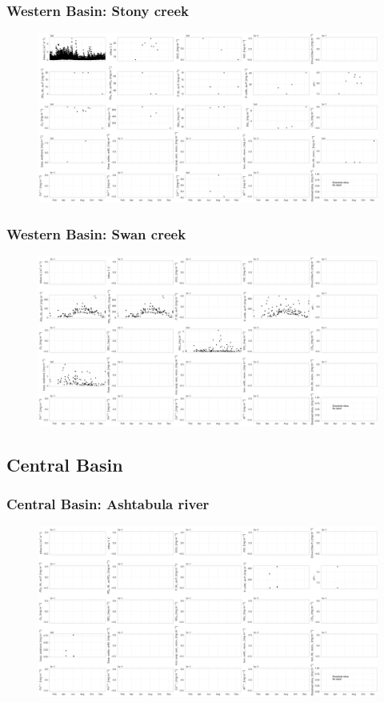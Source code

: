 \documentclass{beamer}
\begin{document}
\begin{frame}
\frametitle{Western Basin: Stony creek}
\begin{figure}
\includegraphics[width=\textwidth]{rivers/Western basin/plot_1yr stonycreek.png}
\end{figure}
\end{frame}


\begin{frame}
\frametitle{Western Basin: Swan creek}
\begin{figure}
\includegraphics[width=\textwidth]{rivers/Western basin/plot_1yr swancreek.png}
\end{figure}
\end{frame}



\subsection{Central Basin}
\label{sub:central_basin}


\begin{frame}
\frametitle{Central Basin: Ashtabula river}
\begin{figure}
\includegraphics[width=\textwidth]{rivers/Central basin/plot_1yr ashtabulariver.png}
\end{figure}
\end{frame}
\end{document}
